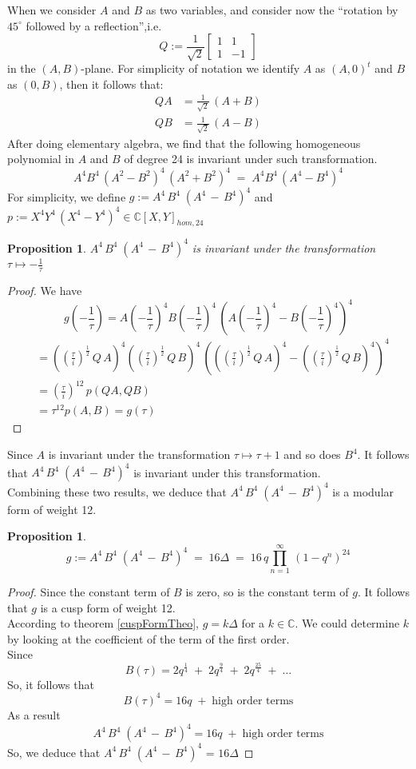 \documentclass{article}
\newtheorem{prop}[theorem]{Proposition}
\numberwithin{equation}{theorem}
\numberwithin{figure}{theorem}
\newcommand{\polyAB}[2]{\ensuremath{#1^4#2^4\,(#1^4 - #2^4)^4}}
\newcommand{\Complex}{\ensuremath{\mathbb{C}}}
\newcommand{\imaginary}{\ensuremath{i}}
\newcommand{\twoFourDegreeAB}{\ensuremath{A^4\,B^4\;(A^4 \,-\, B^4)^4}}
\begin{document}
When we consider $A$ and $B$ as two variables, and consider now the ``rotation by $45^{\circ}$ followed by a reflection'',i.e.
\[
	Q := \frac{1}{\sqrt{2}}
	\left [
	\begin{matrix}
		1 & 1\\
		1 & -1
	\end{matrix}
	\right]
\] in the $(A,B)$-plane. For simplicity of notation we identify $A$ as $(A,0)^t$ and $B$ as $(0,B)$, then it follows that:
\begin{align*}
	QA &= \frac{1}{\sqrt{2}}\,(A + B)\\
	QB &= \frac{1}{\sqrt{2}}\,(A - B) 
\end{align*}
After doing elementary algebra, we find that the following homogeneous polynomial in $A$ and $B$ of degree 24 is invariant under such transformation.
\[
	A^4B^4 \,(A^2 - B^2)^4 \, (A^2 + B^2)^4 \; = \; A^4B^4\,(A^4 - B^4)^4
\]
For simplicity, we define $g := {\twoFourDegreeAB}$  and $p := \polyAB{X}{Y} \in \Complex[X,Y]_{hom,24}$
\begin{prop}\label{twoFourABInvarProp}
	{\twoFourDegreeAB} is invariant under the transformation 
	$\tau \mapsto -\frac{1}{\tau}$
\end{prop}
\begin{proof}
We have
\[
	g(-\frac{1}{\tau}) = \polyAB{A(-\frac{1}{\tau})}{B(-\frac{1}{\tau})}
\]
\begin{align*}
 &= \polyAB{((\frac{\tau}{\imaginary})^{\frac{1}{2}}\,Q\,A)}{((\frac{\tau}{\imaginary})^{\frac{1}{2}}\,Q\,B)}\\
 &= (\frac{\tau}{\imaginary})^{12} \, p(QA, QB) \\
 &= \tau^{12}p(A,B) = g(\tau)
\end{align*}
\end{proof}
Since $A$ is invariant under the transformation $\tau \mapsto \tau + 1$ and so does $B^4$. It follows that {\twoFourDegreeAB} is invariant under this transformation.\\
Combining these two results, we deduce that $\twoFourDegreeAB$ is a modular form of weight 12.
\begin{prop}\label{twoFourDegABDelta}
\[
	g := {\twoFourDegreeAB} \;= \; 16 \Delta \;= \; 16\,q\prod_{n = 1}^{\infty}\,(1 - q^n)^{24}
\]
\end{prop}
\begin{proof}
Since the constant term of $B$ is zero, so is the constant term of $g$. It follows that $g$ is a cusp form of weight 12. \\
According to theorem \ref{cuspFormTheo},  $g = k \Delta$ for a $k \in \Complex$. We could determine $k$ by looking at the coefficient of the term of the first order.\\
Since
\[
	B(\tau) = 2 q^{\frac{1}{4}} \; + \; 2q^{\frac{9}{4}} \;+\; 2q^{\frac{25}{4}} \; + \; \ldots 
\]
So, it follows that
\[
	B(\tau)^4 = 16 q \; + \; \mbox{high order terms}
\]
As a result
\[
	\twoFourDegreeAB = 16 q \; + \; \mbox{high order terms} 
\]
So, we deduce that $\twoFourDegreeAB$ = $16 \Delta$
\end{proof}
\end{document}
